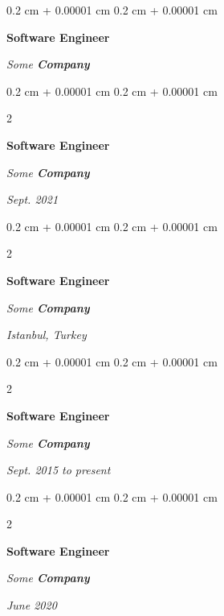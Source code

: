 \documentclass[10pt, letterpaper]{article}
\newenvironment{onecolentry}{
    \begin{adjustwidth}{
        0.2 cm + 0.00001 cm
    }{
        0.2 cm + 0.00001 cm
    }
}{
    \end{adjustwidth}
} %
\newenvironment{twocolentry}[2][]{
    \onecolentry
    \def\secondColumn{#2}
    \setcolumnwidth{\fill, 4.5 cm}
    \begin{paracol}{2}
}{
    \switchcolumn \raggedleft \secondColumn
    \end{paracol}
    \endonecolentry
} %
\begin{document}
        
        \begin{onecolentry}
            \textbf{Software Engineer}
            
            \textit{Some \textbf{Company}}
        \end{onecolentry}



        \vspace{0.2 cm-3px}

        \begin{twocolentry}{
            
            
        \textit{Sept. 2021}}
            \textbf{Software Engineer}
            
            \textit{Some \textbf{Company}}
        \end{twocolentry}



        \vspace{0.2 cm-3px}

        \begin{twocolentry}{
        \textit{Istanbul, Turkey}    
            
        }
            \textbf{Software Engineer}
            
            \textit{Some \textbf{Company}}
        \end{twocolentry}



        \vspace{0.2 cm-3px}

        \begin{twocolentry}{
            
            
        \textit{Sept. 2015 to present}}
            \textbf{Software Engineer}
            
            \textit{Some \textbf{Company}}
        \end{twocolentry}



        \vspace{0.2 cm-3px}

        \begin{twocolentry}{
            
            
        \textit{June 2020}}
            \textbf{Software Engineer}
            
            \textit{Some \textbf{Company}}
        \end{twocolentry}
\end{document}

